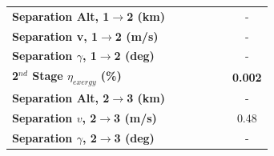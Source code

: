 \begin{table}[ht]
\begin{tabular}{l c c c c c c}
		\textbf{Separation Alt, 1$\rightarrow$2 (km)}
		& \firstsecondSeparationAltTThreeNinetyNoReturn
		& \firstsecondSeparationAltTThreeNinetyFiveNoReturn
		& \firstsecondSeparationAltTThreeStandardNoReturn
		& \firstsecondSeparationAltTThreeOneHundredFiveNoReturn
		& \firstsecondSeparationAltTThreeOneHundredTenNoReturn
		& -
		\\
		\textbf{Separation v, 1$\rightarrow$2 (m/s)}
		& \firstsecondSeparationvTThreeNinetyNoReturn
		& \firstsecondSeparationvTThreeNinetyFiveNoReturn
		& \firstsecondSeparationvTThreeStandardNoReturn
		& \firstsecondSeparationvTThreeOneHundredFiveNoReturn
		& \firstsecondSeparationvTThreeOneHundredTenNoReturn
		& -
		\\
		\textbf{Separation $\gamma$, 1$\rightarrow$2 (deg)}
		& \firstsecondSeparationgammaTThreeNinetyNoReturn
		& \firstsecondSeparationgammaTThreeNinetyFiveNoReturn
		& \firstsecondSeparationgammaTThreeStandardNoReturn
		& \firstsecondSeparationgammaTThreeOneHundredFiveNoReturn
		& \firstsecondSeparationgammaTThreeOneHundredTenNoReturn
		& -
		\\
		\hline 
		\textbf{2$^{nd}$ Stage $\eta_{exergy}$ (\%)}
		& \textbf{\secondExergyEffTThreeNinetyNoReturn}
		& \textbf{\secondExergyEffTThreeNinetyFiveNoReturn}
		& \textbf{\secondExergyEffTThreeStandardNoReturn}
		& \textbf{\secondExergyEffTThreeOneHundredFiveNoReturn}
		& \textbf{\secondExergyEffTThreeOneHundredTenNoReturn}
		& \textbf{0.002}
		\\
	
		\textbf{Separation Alt, 2$\rightarrow$3 (km)}
		& \secondthirdSeparationAltTThreeNinetyNoReturn
		& \secondthirdSeparationAltTThreeNinetyFiveNoReturn
		& \secondthirdSeparationAltTThreeStandardNoReturn
		& \secondthirdSeparationAltTThreeOneHundredFiveNoReturn
		& \secondthirdSeparationAltTThreeOneHundredTenNoReturn
		& -
		\\
		\textbf{Separation $v$, 2$\rightarrow$3 (m/s)}
		& \secondthirdSeparationvTThreeNinetyNoReturn
		& \secondthirdSeparationvTThreeNinetyFiveNoReturn
		& \secondthirdSeparationvTThreeStandardNoReturn
		& \secondthirdSeparationvTThreeOneHundredFiveNoReturn
		& \secondthirdSeparationvTThreeOneHundredTenNoReturn
		&0.48
		\\
		\textbf{Separation $\gamma$, 2$\rightarrow$3 (deg)}
		& \secondthirdSeparationgammaTThreeNinetyNoReturn
		& \secondthirdSeparationgammaTThreeNinetyFiveNoReturn
		& \secondthirdSeparationgammaTThreeStandardNoReturn
		& \secondthirdSeparationgammaTThreeOneHundredFiveNoReturn
		& \secondthirdSeparationgammaTThreeOneHundredTenNoReturn
		& -
		\\
	

\end{tabular}
\end{table}
